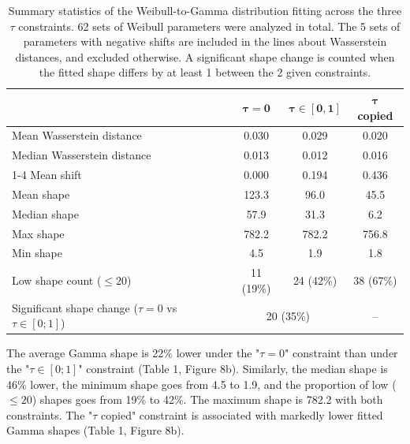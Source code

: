 \documentclass[12pt,a4paper,onecolumn]{article}
\begin{document}
\begin{table}[h]
\centering
\begin{tabular}{lccc}
\toprule
\textbf{} & $\boldsymbol{\tau = 0}$ & $\boldsymbol{\tau \in [0,1]}$ & $\boldsymbol{\tau}$ \textbf{copied} \\
\midrule
Mean Wasserstein distance & 0.030 & 0.029 & 0.020 \\ 
Median Wasserstein distance & 0.013 & 0.012 & 0.016 \\\cmidrule{1-4}
Mean shift & 0.000 & 0.194 & 0.436 \\ 
Mean shape & 123.3 & 96.0 & 45.5 \\
Median shape & 57.9 & 31.3 & 6.2 \\
Max shape & 782.2 & 782.2 & 756.8 \\
Min shape & 4.5 & 1.9 & 1.8 \\
Low shape count ($\leq 20$) & 11 (19\%) & 24 (42\%) & 38 (67\%) \\
Significant shape change ($\tau=0$ vs $\tau \in  [0;1]$) & \multicolumn{2}{c}{20 (35\%)} & -- \\
\bottomrule
\end{tabular}
\caption{Summary statistics of the Weibull-to-Gamma distribution fitting across the three $\tau$ constraints.  62 sets of Weibull parameters were analyzed in total.  The 5 sets of parameters with negative shifts are included in the lines about Wasserstein distances, and excluded otherwise. A significant shape change is counted when the fitted shape differs by at least 1 between the 2 given constraints.}
\end{table}

\tabto{1 cm} The average Gamma shape is 22\% lower under the "$\tau = 0$" constraint than under the "$\tau \in [0;1]$" constraint (Table 1, Figure 8b). Similarly, the median shape is 46\% lower, the minimum shape goes from 4.5 to 1.9, and the proportion of low ($\leq 20$) shapes goes from 19\% to 42\%. The maximum shape is 782.2 with both constraints. The "$\tau$ copied" constraint is associated with markedly lower fitted Gamma shapes (Table 1, Figure 8b). 
\end{document}

